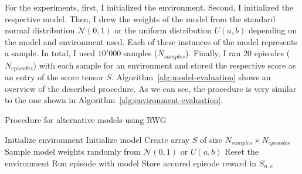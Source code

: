 For the experiments, first, I initialized the environment. Second, I initialized the respective model. Then, I drew the weights of the model from the standard normal distribution $\mathcal{N}(0,1)$ or the uniform distribution $U(a,b)$ depending on the model and environment used. Each of these instances of the model represents a sample. In total, I used $10'000$ samples ($N_{samples}$). Finally, I ran 20 episodes ($N_{episodes}$) with each sample for an environment and stored the respective score as an entry of the score tensor $S$. Algorithm~\ref{alg:model-evaluation} shows an overview of the described procedure. As we can see, the procedure is very similar to the one shown in Algorithm~\ref{alg:environment-evaluation}.
\begin{algorithm}
\caption{Procedure for alternative models using RWG}
\begin{algorithmic}[1]
\State Initialize environment
\State Initialize model
\State Create array $S$ of size $N_{samples} \times N_{episodes}$
    \State Sample model weights randomly from $\mathcal{N}(0,1)$ or $U(a, b)$
      \State Reset the environment
      \State Run episode with model
      \State Store accured episode reward in $S_{n,e}$
    \EndFor
\EndFor
\end{algorithmic}
\label{alg:model-evaluation}
\end{algorithm}

